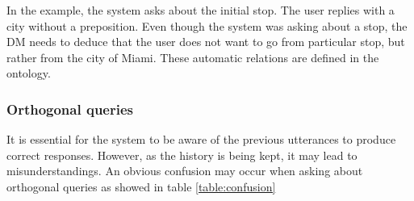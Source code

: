 In the example, the system asks about the initial stop.
The user replies with a city without a preposition.
Even though the system was asking about a stop, the \ac{DM} needs to deduce that the user does not want to go from particular stop, but rather from the city of Miami.
These automatic relations are defined in the ontology.





\subsubsection{Orthogonal queries}

It is essential for the system to be aware of the previous utterances to produce correct responses.
However, as the history is being kept, it may lead to misunderstandings.
An obvious confusion may occur when asking about orthogonal queries as showed in table \ref{table:confusion}

